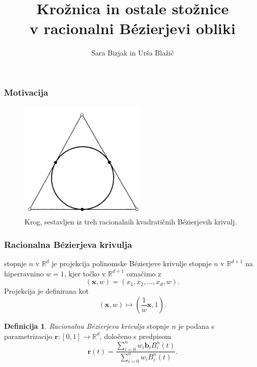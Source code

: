 \documentclass[a4paper, 12pt]{beamer}
\title[CAGD projekt]{Krožnica in ostale stožnice \\
v racionalni B\'ezierjevi obliki
}
\author{Sara Bizjak in Urša Blažič}
\institute[FMF]{Fakulteta za matematiko in fiziko}
\theoremstyle{definition}
\newtheorem*{definicija}{Definicija}
\theoremstyle{plain}
\begin{document}
\titlepage


\begin{frame}
\frametitle{Motivacija}
    
\begin{figure}[ht!]
    \centering
    \includegraphics[width=60mm]{krog_po_delih.png}
    \caption{Krog, sestavljen iz treh racionalnih kvadratičnih B\'ezierjevih krivulj.}
    \label{slika:krogpodelih}
\end{figure}
    
    
\end{frame}


\begin{frame}
\frametitle{Racionalna B\'ezierjeva krivulja}
    
    stopnje $n$ v $\mathbb{R}^d$ je projekcija polinomske B\'ezierjeve krivulje stopnje $n$ v $\mathbb{R}^{d+1}$ na hiperravnino $w=1$, kjer točko v  $\mathbb{R}^{d+1}$  označimo z
    $$(\boldsymbol{x},w)=(x_1,x_2,\dots,x_d,w).$$
    Projekcija je definirana kot
    $$(\boldsymbol{x},w)\mapsto (\frac{1}{w}\boldsymbol{x},1).$$

    \begin{definicija}
        \emph{Racionalna B\'ezierjeva krivulja} stopnje $n$ je podana s parametrizacijo $\boldsymbol{r}:[0,1]\rightarrow \mathbb{R}^d$, določeno s predpisom
        $$\boldsymbol{r}(t)=\frac{\sum_{i=0}^n w_i\boldsymbol{b}_iB_i^n(t)}{\sum_{i=0}^n w_iB_i^n(t)}.$$      
    \end{definicija}

\end{frame}


\end{document}
